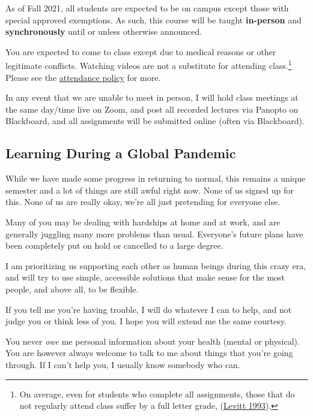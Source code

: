 \documentclass{article}
\begin{document}
As of Fall 2021, all students are expected to be on campus except those
with special approved exemptions. As such, this course will be taught
\textbf{in-person} and \textbf{synchronously} until or unless otherwise
announced.

You are expected to come to class except due to medical reasons or other
legitimate conflicts. Watching videos are not a substitute for attending
class.\footnote{On average, even for students who complete all
  assignments, those that do not regularly attend class suffer by a full
  letter grade,
  (\href{https://www.aeaweb.org/articles?id=10.1257/jep.7.3.167}{Levitt
  1993}).} Please see the \protect\hyperlink{attendance}{attendance
policy} for more.

In any event that we are unable to meet in person, I will hold class
meetings at the same day/time live on Zoom, and post all recorded
lectures via Panopto on Blackboard, and all assignments will be
submitted online (often via Blackboard).

\hypertarget{learning-during-a-global-pandemic}{%
\subsection{Learning During a Global
Pandemic}\label{learning-during-a-global-pandemic}}

While we have made some progress in returning to normal, this remains a
unique semester and a lot of things are still awful right now. None of
us signed up for this. None of us are really okay, we're all just
pretending for everyone else.

Many of you may be dealing with hardships at home and at work, and are
generally juggling many more problems than usual. Everyone's future
plans have been completely put on hold or cancelled to a large degree.

I am prioritizing us supporting each other as human beings during this
crazy era, and will try to use simple, accessible solutions that make
sense for the most people, and above all, to be flexible.

If you tell me you're having trouble, I will do whatever I can to help,
and not judge you or think less of you. I hope you will extend me the
same courtesy.

You never \emph{owe} me personal information about your health (mental
or physical). You are however always welcome to talk to me about things
that you're going through. If I can't help you, I usually know somebody
who can.
\end{document}
